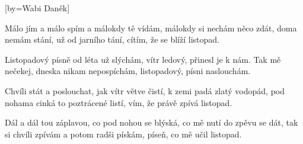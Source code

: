 [by={Wabi Daněk}]

\beginverse{}
Málo jím a málo spím a málokdy tě vídám,
málokdy si nechám něco zdát, 
doma nemám stání, už od jarního tání,
cítím, že se blíží listopad.
\endverse{}

\beginchorus{}
Listopadový písně od léta už slýchám,
vítr ledový, přinesl je k nám.
Tak mě nečekej, dneska nikam nepospíchám,
listopadový, písni naslouchám.
\endchorus{}

\beginverse*{}
   
\endverse{}

\beginverse{}
Chvíli stát a poslouchat, jak vítr větve čistí,
k zemi padá zlatý vodopád, 
pod nohama cinká to poztrácené listí,
vím, že právě zpívá listopad.
\endverse{}

\beginchorus{}
\phantom{}
\endchorus{}

\beginverse{}
Dál a dál tou záplavou, co pod nohou se blýská,
co mě nutí do zpěvu se dát, 
tak si chvíli zpívám a potom radši pískám,
píseň, co mě učil listopad.
\endverse{}

\beginchorus{}
\phantom{}
\endchorus{}

\endsong{}
